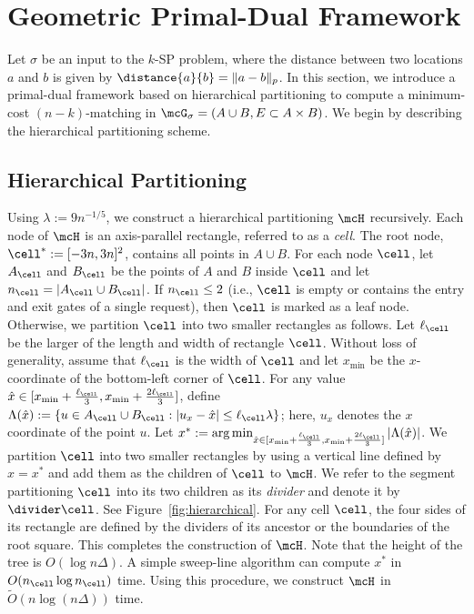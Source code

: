 \section{Geometric Primal-Dual Framework}\label{sec:geo-primal-dual}

Let $\sigma$ be an input to the $k$-SP problem, where the distance between two locations $a$ and $b$ is given by $\distance{a}{b}=\|a-b\|_p$. In this section, we introduce a primal-dual framework based on hierarchical partitioning to compute a minimum-cost $(n-k)$-matching in $\mcG_\sigma=(A\cup B, E\subset A\times B)$. We begin by describing the hierarchical partitioning scheme.

%


\subsection{Hierarchical Partitioning}\label{sec:hierarchical}
Using $\lambda:=9n^{-1/5}$, we construct a hierarchical partitioning $\mcH$ recursively. Each node of $\mcH$ is an axis-parallel rectangle, referred to as a \emph{cell}. The root node, $\cell^*:=[-3n, 3n]^2$, contains all points in $A\cup B$. For each node $\cell$, let $A_\cell$ and $B_\cell$ be the points of $A$ and $B$ inside $\cell$ and let $n_{\cell}=|A_\cell \cup B_{\cell}|$. If $n_{\cell}\le2$ (i.e., $\cell$ is empty or contains the entry and exit gates of a single request), then $\cell$ is marked as a leaf node. Otherwise, we partition $\cell$ into two smaller rectangles as follows. Let $\ell_\cell$ be the larger of the length and width of rectangle $\cell$. Without loss of generality, assume that $\ell_\cell$ is the width of $\cell$ and let $x_{\min}$ be the $x$-coordinate of the bottom-left corner of $\cell$.   For any value $\hat{x}\in [x_{\min}+\frac{\ell_\cell}{3}, x_{\min}+\frac{2\ell_\cell}{3}]$, define $\Lambda(\hat{x}):=\{u\in A_\cell\cup B_\cell: |u_x-\hat{x}|\le \ell_\cell\lambda\}$; here, $u_x$ denotes the $x$ coordinate of the point $u$. Let $x^*:=\arg\min_{\hat{x}\in [x_{\min}+\frac{\ell_\cell}{3}, x_{\min}+\frac{2\ell_\cell}{3}]}|\Lambda(\hat{x})|$. 
We partition $\cell$ into two smaller rectangles by using a vertical line defined by $x=x^*$ and add them as the children of $\cell$ to $\mcH$. We refer to the segment partitioning $\cell$ into its two children as its \emph{divider} and denote it by $\divider\cell$. See Figure~\ref{fig:hierarchical}. For any cell $\cell$, the four sides of its rectangle are defined by the dividers of its ancestor or the boundaries of the root square.
This completes the construction of $\mcH$. Note that the height of the tree is $O(\log n\Delta)$. A simple sweep-line algorithm can compute $x^*$ in $O(n_\cell\log n_\cell)$ time. Using this procedure, we construct $\mcH$ in $\tilde{O}(n \log (n\Delta))$ time.
